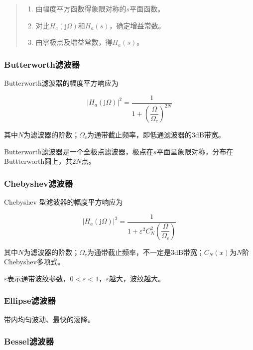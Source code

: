 \documentclass[cn, hazy, blue, normal, 12pt]{elegantnote}
\begin{document}
\begin{quote}
\begin{enumerate}
    \item 由幅度平方函数得象限对称的$s$平面函数。
    \item 对比$H_a(\text{j}\Omega)$和$H_a(s)$，确定增益常数。
    \item 由零极点及增益常数，得$H_a(s)$。
\end{enumerate}
\end{quote}

\subsubsection{Butterworth滤波器}

Butterworth滤波器的幅度平方响应为

\begin{equation}
    |H_a(\text{j}\Omega)|^2=\frac{1}{1+\left(\dfrac{\Omega}{\Omega_c}\right)^{2N}}
\end{equation}

其中$N$为滤波器的阶数；$\Omega_c$为通带截止频率，即低通滤波器的3dB带宽。

Butterworth滤波器是一个全极点滤波器，极点在$s$平面呈象限对称，分布在Buttterworth圆上，共$2N$点。

\subsubsection{Chebyshev滤波器}

Chebyshev \uppercase\expandafter{}型滤波器的幅度平方响应为

\begin{equation}
    |H_a(\text{j}\Omega)|^2=\frac{1}{1+\varepsilon^2 C_N^2 \left(\dfrac{\Omega}{\Omega_c}\right)}
\end{equation}

其中$N$为滤波器的阶数；$\Omega_c$为通带截止频率，不一定是3dB带宽；$C_N(x)$为$N$阶Chebyshev多项式。

$\varepsilon$表示通带波纹参数，$0<\varepsilon<1$，$\varepsilon$越大，波纹越大。

\subsubsection{Ellipse滤波器}

带内均匀波动、最快的滚降。

\subsubsection{Bessel滤波器}
\end{document}
